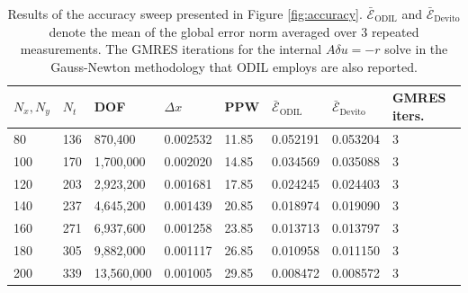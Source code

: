\documentclass[final-report]{report-template}
\begin{document}
\begin{table}[!htp]
    \centering    
    \begin{tabular}{llllllll}
        \toprule
        $N_x, N_y$ & $N_t$ & DOF & $\Delta x$ & PPW & $\bar{\mathcal{E}}_\text{ODIL}$ & $\bar{\mathcal{E}}_\text{Devito}$ & GMRES iters. \\
        \midrule
    80 & 136 & 870,400 & 0.002532 & 11.85 & 0.052191 & 0.053204 & 3\\	
    100 & 170 &	1,700,000 & 0.002020 & 14.85 & 0.034569 & 0.035088 & 3 \\	
    120 & 203 &2,923,200 & 0.001681 & 17.85 & 0.024245 & 0.024403 & 3 \\
    140 & 237 & 4,645,200 & 0.001439 & 20.85 & 0.018974 & 0.019090 & 3 \\
    160	& 271 & 6,937,600 & 0.001258 & 23.85 & 0.013713 & 0.013797 & 3 \\	
    180	& 305 & 9,882,000 & 0.001117 & 26.85 & 0.010958 & 0.011150 & 3 \\
    200	& 339 & 13,560,000 & 0.001005 & 29.85 & 0.008472 & 0.008572 & 3 \\
        \bottomrule
    \end{tabular}
    \caption{Results of the accuracy sweep presented in Figure \ref{fig:accuracy}. $\bar{\mathcal{E}}_\text{ODIL}$ and $\bar{\mathcal{E}}_\text{Devito}$ denote the mean of the global error norm averaged over 3 repeated measurements. The GMRES iterations for the internal $A\delta u = -r$ solve in the Gauss-Newton methodology that ODIL employs are also reported.}
    \label{tab:accuracy}
\end{table}
\end{document}
